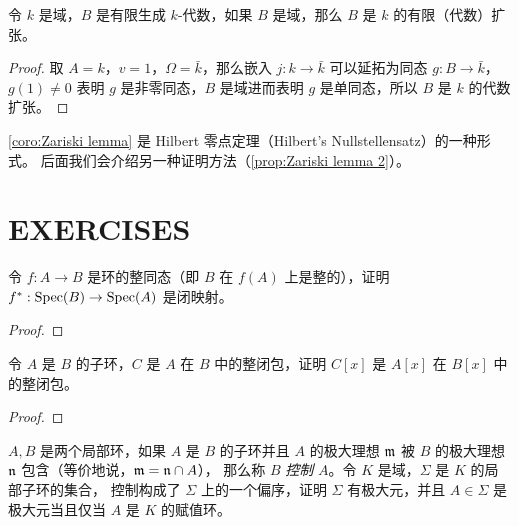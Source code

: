 \begin{corollary}[Zariski 引理]\label{coro:Zariski lemma}
  令 $k$ 是域，$B$ 是有限生成 $k$-代数，如果 $B$ 是域，那么 $B$ 是 $k$
  的有限（代数）扩张。
\end{corollary}
\begin{proof}
  取 $A=k$，$v=1$，$\Omega=\bar k$，那么嵌入 $j:k\to\bar k$ 可以延拓为同态
  $g:B\to\bar k$，$g(1)\neq 0$ 表明 $g$ 是非零同态，$B$ 是域进而表明 $g$
  是单同态，所以 $B$ 是 $k$ 的代数扩张。
\end{proof}

\autoref{coro:Zariski lemma} 是 Hilbert 零点定理（Hilbert's Nullstellensatz）的一种形式。
后面我们会介绍另一种证明方法（\autoref{prop:Zariski lemma 2}）。

\section{EXERCISES}

\begin{problem}
  令 $f:A\to B$ 是环的整同态（即 $B$ 在 $ f(A)$ 上是整的），证明 $f^*:\operatorname{Spec}(B)\to\operatorname{Spec}(A)$
  是闭映射。
\end{problem}
\begin{proof}
  
\end{proof}

\begin{problem}
  令 $A$ 是 $B$ 的子环，$C$ 是 $A$ 在 $B$ 中的整闭包，证明 $C[x]$ 是 $A[x]$
  在 $B[x]$ 中的整闭包。
\end{problem}
\begin{proof}
  
\end{proof}

\begin{problem}
  $A,B$ 是两个局部环，如果 $A$ 是 $B$ 的子环并且 $A$ 的极大理想 $\mathfrak{m}$
  被 $B$ 的极大理想 $\mathfrak{n}$ 包含（等价地说，$\mathfrak{m}=\mathfrak{n}\cap A$），
  那么称 $B$ \emph{控制} $A$。令 $K$ 是域，$\Sigma$ 是 $K$ 的局部子环的集合，
  控制构成了 $\Sigma$ 上的一个偏序，证明 $\Sigma$ 有极大元，并且 $A\in\Sigma$
  是极大元当且仅当 $A$ 是 $K$ 的赋值环。
\end{problem}


